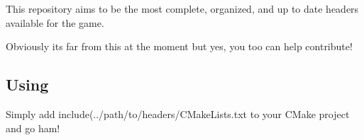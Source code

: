 This repository aims to be the most complete, organized, and up to date headers available for the game.

Obviously it\textquotesingle{}s far from this at the moment but yes, you too can help contribute!

\subsection*{Using}

Simply add {\ttfamily include(../path/to/headers/\+C\+Make\+Lists.txt} to your C\+Make project and go ham! 